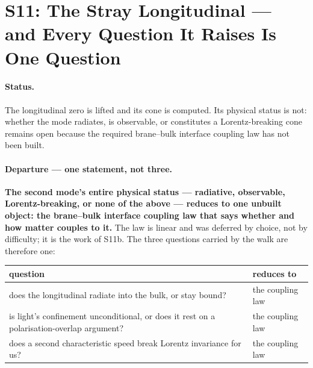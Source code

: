 \section{S11: The Stray Longitudinal --- and Every Question It Raises Is One
Question}\label{step:S11}


\paragraph{Status.}
The longitudinal zero is lifted and its cone is computed. Its physical status
is not: whether the mode radiates, is observable, or constitutes a
Lorentz-breaking cone remains open because the required brane--bulk interface
coupling law has not been built.

\paragraph{Departure --- one statement, not three.}
\textbf{The second mode's entire physical status --- radiative, observable,
Lorentz-breaking, or none of the above --- reduces to one unbuilt object: the
brane--bulk interface coupling law that says whether and how matter couples to
it.} The law is linear and was deferred by choice, not by difficulty; it is the
work of S11b. The three questions carried by the walk are therefore one:
\begin{center}
\begin{tabular}{@{}L{0.60\textwidth}L{0.27\textwidth}@{}}
\toprule
question & reduces to \\
\midrule
does the longitudinal radiate into the bulk, or stay bound? & the coupling law \\
is light's confinement unconditional, or does it rest on a
polarisation-overlap argument? & the coupling law \\
does a second characteristic speed break Lorentz invariance for us? & the coupling law \\
\bottomrule
\end{tabular}
\end{center}

